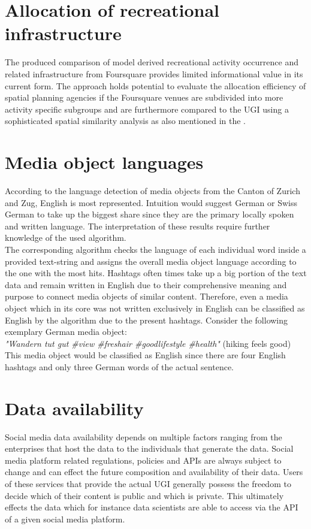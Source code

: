 \section{Allocation of recreational infrastructure} \label{discussion_foursquare}
The produced comparison of model derived recreational activity occurrence and related infrastructure from Foursquare provides limited informational value in its current form. The approach holds potential to evaluate the allocation efficiency of spatial planning agencies if the Foursquare venues are subdivided into more activity specific subgroups and are furthermore compared to the UGI using a sophisticated spatial similarity analysis as also mentioned in the .

\section{Media object languages}
According to the language detection of media objects from the Canton of Zurich and Zug, English is most represented. Intuition would suggest German or Swiss German to take up the biggest share since they are the primary locally spoken and written language. The interpretation of these results require further knowledge of the used algorithm.\\
The corresponding algorithm checks the language of each individual word inside a provided text-string and assigns the overall media object language according to the one with the most hits. Hashtags often times take up a big portion of the text data and remain written in English due to their comprehensive meaning and purpose to connect media objects of similar content. Therefore, even a media object which in its core was not written exclusively in English can be classified as English by the algorithm due to the present hashtags. Consider the following exemplary German media object: \\ \textit{"Wandern tut gut \#view \#freshair \#goodlifestyle \#health"} (hiking feels good) \\ This media object would be classified as English since there are four English hashtags and only three German words of the actual sentence.

\section{Data availability}
Social media data availability depends on multiple factors ranging from the enterprises that host the data to the individuals that generate the data. Social media platform related regulations, policies and APIs are always subject to change and can effect the future composition and availability of their data. Users of these services that provide the actual UGI generally possess the freedom to decide which of their content is public and which is private. This ultimately effects the data which for instance data scientists are able to access via the API of a given social media platform.

